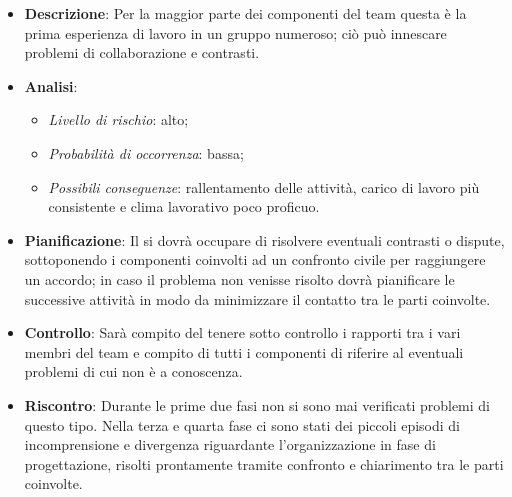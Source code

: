 			\begin{itemize}
				\item \textbf{Descrizione}: Per la maggior parte dei componenti del team questa è la prima esperienza di lavoro in un gruppo numeroso; ciò può  innescare problemi di collaborazione e contrasti.
				\item \textbf{Analisi}:
				\begin{itemize}
					\item \textit{Livello di rischio}: alto;
					\item \textit{Probabilità di occorrenza}: bassa;
					\item \textit{Possibili conseguenze}: rallentamento delle attività, carico di lavoro più consistente e clima lavorativo poco proficuo.
				\end{itemize}
				\item \textbf{Pianificazione}: Il  si dovrà occupare di risolvere eventuali contrasti o dispute, sottoponendo i componenti coinvolti ad un confronto civile per raggiungere un accordo; in caso il problema non venisse risolto dovrà pianificare le successive attività in modo da minimizzare il contatto tra le parti coinvolte.
				\item \textbf{Controllo}: Sarà compito del  tenere sotto controllo i rapporti tra i vari membri del team e compito di tutti i componenti di riferire al  eventuali problemi di cui non è a conoscenza.
				\item \textbf{Riscontro}: Durante le prime due fasi non si sono mai verificati problemi di questo tipo. Nella terza e quarta fase ci sono stati dei piccoli episodi di incomprensione e divergenza riguardante l’organizzazione in fase di progettazione, risolti prontamente tramite confronto e chiarimento tra le parti coinvolte.
			\end{itemize}

